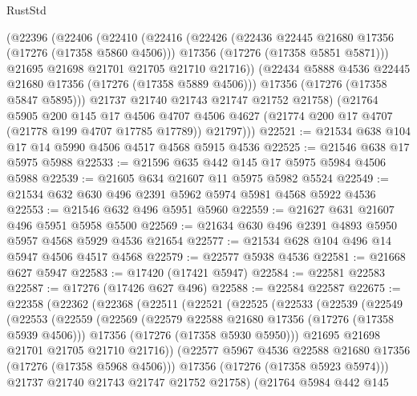 \begin{lexlean}{RustStd}
\begin{coremodule}
        (@22396
          (@22406
            (@22410
              (@22416
                (@22426
                  (@22436 @22445 @21680 @17356 (@17276 (@17358 @5860 @4506)))
                  @17356
                  (@17276 (@17358 @5851 @5871)))
                @21695
                @21698
                @21701
                @21705
                @21710
                @21716))
            (@22434 @5888 @4536 @22445 @21680 @17356 (@17276 (@17358 @5889 @4506)))
            @17356
            (@17276 (@17358 @5847 @5895)))
          @21737
          @21740
          @21743
          @21747
          @21752
          @21758)
        (@21764
          @5905
          @200
          @145
          @17
          @4506
          @4707
          @4506
          @4627
          (@21774 @200 @17 @4707 (@21778 @199 @4707 @17785 @17789))
          @21797)))
@22521 := @21534 @638 @104 @17 @14 @5990 @4506 @4517 @4568 @5915 @4536
@22525 := @21546 @638 @17 @5975 @5988
@22533 := @21596 @635 @442 @145 @17 @5975 @5984 @4506 @5988
@22539 := @21605 @634 @21607 @11 @5975 @5982 @5524
@22549 := @21534 @632 @630 @496 @2391 @5962 @5974 @5981 @4568 @5922 @4536
@22553 := @21546 @632 @496 @5951 @5960
@22559 := @21627 @631 @21607 @496 @5951 @5958 @5500
@22569 := @21634 @630 @496 @2391 @4893 @5950 @5957 @4568 @5929 @4536 @21654
@22577 := @21534 @628 @104 @496 @14 @5947 @4506 @4517 @4568
@22579 := @22577 @5938 @4536
@22581 := @21668 @627 @5947
@22583 := @17420 (@17421 @5947)
@22584 := @22581 @22583
@22587 := @17276 (@17426 @627 @496)
@22588 := @22584 @22587
@22675 := @22358
    (@22362
      (@22368
        (@22511
          (@22521
            (@22525
              (@22533
                (@22539
                  (@22549
                    (@22553
                      (@22559
                        (@22569
                          (@22579 @22588 @21680 @17356 (@17276 (@17358 @5939 @4506)))
                          @17356
                          (@17276 (@17358 @5930 @5950)))
                        @21695
                        @21698
                        @21701
                        @21705
                        @21710
                        @21716))
                    (@22577 @5967 @4536 @22588 @21680 @17356 (@17276 (@17358 @5968 @4506)))
                    @17356
                    (@17276 (@17358 @5923 @5974)))
                  @21737
                  @21740
                  @21743
                  @21747
                  @21752
                  @21758)
                (@21764
                  @5984
                  @442
                  @145

\end{coremodule}
\end{lexlean}
